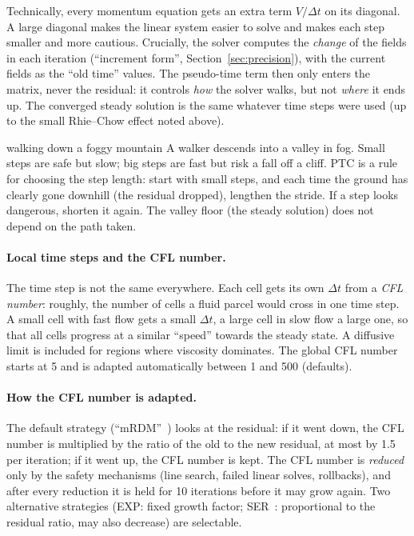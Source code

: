 \documentclass[11pt,a4paper]{article}
\begin{document}
Technically, every momentum equation gets an extra term $V/\Delta t$ on its
diagonal. A large diagonal makes the linear system easier to solve and
makes each step smaller and more cautious. Crucially, the solver computes
the \emph{change} of the fields in each iteration (``increment form'',
Section~\ref{sec:precision}), with the current fields as the ``old time''
values. The pseudo-time term then only enters the matrix, never the
residual: it controls \emph{how} the solver walks, but not \emph{where} it
ends up. The converged steady solution is the same whatever time steps were
used (up to the small Rhie--Chow effect noted above).

\begin{intuition}{walking down a foggy mountain}
  A walker descends into a valley in fog. Small steps are safe but slow;
  big steps are fast but risk a fall off a cliff. PTC is a rule for choosing
  the step length: start with small steps, and each time the ground has
  clearly gone downhill (the residual dropped), lengthen the stride. If a
  step looks dangerous, shorten it again. The valley floor (the steady
  solution) does not depend on the path taken.
\end{intuition}

\paragraph{Local time steps and the CFL number.}
The time step is not the same everywhere. Each cell gets its own $\Delta t$
from a \emph{CFL number}: roughly, the number of cells a fluid parcel would
cross in one time step. A small cell with fast flow gets a small $\Delta t$,
a large cell in slow flow a large one, so that all cells progress at a
similar ``speed'' towards the steady state. A diffusive limit is included
for regions where viscosity dominates. The global CFL number starts at 5
and is adapted automatically between 1 and 500 (defaults).

\paragraph{How the CFL number is adapted.}
The default strategy (``mRDM''~\cite{Ceze2011,Ceze2013AIAA}) looks at the
residual: if it went down, the CFL number is multiplied by the ratio of the
old to the new residual, at most by 1.5 per iteration; if it went up, the
CFL number is kept. The CFL number is \emph{reduced} only by the safety
mechanisms (line search, failed linear solves, rollbacks), and after every
reduction it is held for 10 iterations before it may grow again. Two
alternative strategies (EXP: fixed growth factor; SER~\cite{MulderVanLeer1985}:
proportional to the residual ratio, may also decrease) are selectable.
\end{document}
